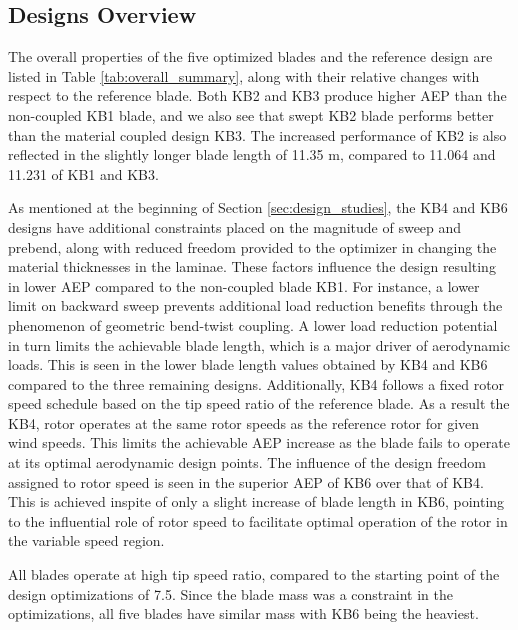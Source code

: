 \subsection{Designs Overview}
\label{subsec:design_overview}
The overall properties of the five optimized blades and the reference design are listed in Table \ref{tab:overall_summary}, along with their relative changes with respect to the reference blade.
Both KB2 and KB3 produce higher AEP than the non-coupled KB1 blade, and we also see that swept KB2 blade performs better than the material coupled design KB3. The increased performance of KB2 is also reflected in the slightly longer blade length of 11.35 m, compared to 11.064 and 11.231 of KB1 and KB3.


As mentioned at the beginning of Section \ref{sec:design_studies}, the KB4 and KB6 designs have additional constraints placed on the magnitude of sweep and prebend, along with reduced freedom provided to the optimizer in changing the material thicknesses in the laminae. These factors influence the design resulting in lower AEP compared to the non-coupled blade KB1. For instance, a lower limit on backward sweep prevents additional load reduction benefits through the phenomenon of geometric bend-twist coupling. A lower load reduction potential in turn limits the achievable blade length, which is a major driver of aerodynamic loads. This is seen in the lower blade length values obtained by KB4 and KB6 compared to the three remaining designs. Additionally, KB4 follows a fixed rotor speed schedule based on the tip speed ratio of the reference blade. As a result the KB4, rotor operates at the same rotor speeds as the reference rotor for given wind speeds. This limits the achievable AEP increase as the blade fails to operate at its optimal aerodynamic design points. The influence of the design freedom assigned to rotor speed is seen in the superior AEP of KB6 over that of KB4. This is achieved inspite of only a slight increase of blade length in KB6, pointing to the influential role of rotor speed to facilitate optimal operation of the rotor in the variable speed region.

All blades operate at high tip speed ratio, compared to the starting point of the design optimizations of 7.5. Since the blade mass was a constraint in the optimizations, all five blades have similar mass with KB6 being the heaviest.

